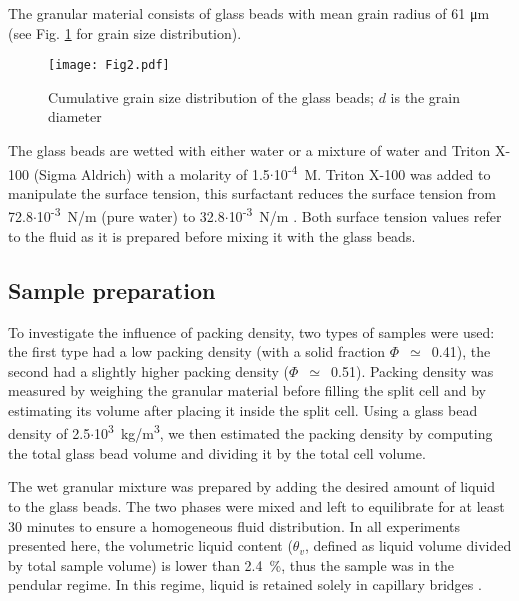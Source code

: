 The granular material consists of glass beads with mean grain radius of 61 \si{\micro\metre} (see Fig. \ref{GrainSizeSI} for grain size distribution).
\begin{figure}
\texttt{[image: Fig2.pdf]}
\caption{Cumulative grain size distribution of the glass beads; $d$ is the grain diameter}
\label{GrainSizeSI}
\end{figure}
The glass beads are wetted with either water or a mixture of water and Triton X-100 (Sigma Aldrich) with a molarity of 1.5$\cdot$10\textsuperscript{-4}~\si{M}. Triton X-100 was added to manipulate the surface tension, this surfactant reduces the surface tension from 72.8$\cdot$10\textsuperscript{-3}~\si{N/m} (pure water) to 32.8$\cdot$10\textsuperscript{-3}~\si{N/m} \cite{Labajos2006}. Both surface tension values refer to the fluid as it is prepared before mixing it with the glass beads.

\subsection{Sample preparation}
\label{sec:Sample preparation}

To investigate the influence of packing density, two types of samples were used: the first type had a low packing density (with a solid fraction $\Phi$~$\simeq$~0.41), the second had a slightly higher packing density ($\Phi$~$\simeq$~0.51). Packing density was measured by weighing the granular material before filling the split cell and by estimating its volume after placing it inside the split cell. Using a glass bead density of 2.5$\cdot$10\textsuperscript{3}~\si{kg/m^3}, we then estimated the packing density by computing the total glass bead volume and dividing it by the total cell volume.

The wet granular mixture was prepared by adding the desired amount of liquid to the glass beads. The two phases were mixed and left to equilibrate for at least 30 minutes to ensure a homogeneous fluid distribution. In all experiments presented here, the volumetric liquid content ($\theta_v$, defined as liquid volume divided by total sample volume) is lower than  2.4~\%, thus the sample was in the pendular regime. In this regime, liquid is retained solely in capillary bridges \cite{Scheel2008NM,Scheel2008JP}.

